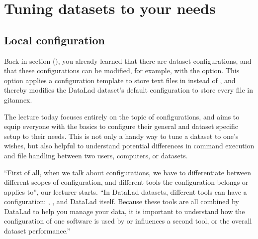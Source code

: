 \chapter{Tuning datasets to your needs}
\label{\detokenize{basics/basics-configuration:tuning-datasets-to-your-needs}}\label{\detokenize{basics/basics-configuration:chapter-config}}\label{\detokenize{basics/basics-configuration:id1}}\label{\detokenize{basics/basics-configuration::doc}}

\sphinxstepscope


\section{Local configuration}
\label{\detokenize{basics/101-122-config:local-configuration}}\label{\detokenize{basics/101-122-config:config}}\label{\detokenize{basics/101-122-config::doc}}
\sphinxAtStartPar
Back in section {\hyperref[\detokenize{basics/101-114-txt2git:text2git}]{}} (), you already learned that there
are dataset configurations, and that these configurations can
be modified, for example, with the  option.
This option applies a configuration template to store text
files in {\hyperref[\detokenize{glossary:term-Git}]{}} instead of {\hyperref[\detokenize{glossary:term-git-annex}]{}}, and thereby
modifies the DataLad dataset’s default configuration to store
every file in git\sphinxhyphen{}annex.

\sphinxAtStartPar
The lecture today focuses entirely on the topic of configurations,
and aims to equip everyone with the basics to configure
their general and dataset specific setup to their needs.
This is not only a handy way to tune a dataset to one’s
wishes, but also helpful to understand potential differences in
command execution and file handling between two users,
computers, or datasets.

\sphinxAtStartPar
“First of all, when we talk about configurations, we have
to differentiate between different scopes of configuration,
and different tools the configuration belongs or applies to”,
our lecturer starts. “In DataLad datasets, different tools can
have a configuration: {\hyperref[\detokenize{glossary:term-Git}]{}}, {\hyperref[\detokenize{glossary:term-git-annex}]{}}, and
DataLad itself. Because these tools are all
combined by DataLad to help you manage your data,
it is important to understand how the configuration of one
software is used by or influences a second tool, or the overall
dataset performance.”

